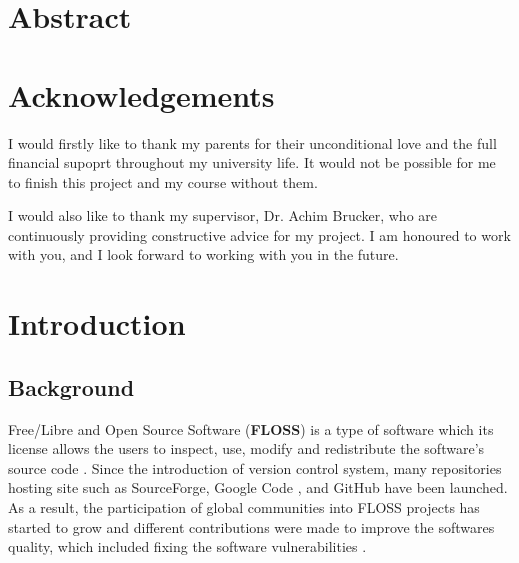 \documentclass[12pt, a4paper]{report}
\begin{document}
\newpage

\chapter*{Abstract}

\chapter*{Acknowledgements}
I would firstly like to thank my parents for their unconditional love and the full financial supoprt
throughout my university life. It would not be possible for me to finish this project and my course
without them.

I would also like to thank my supervisor, Dr. Achim Brucker, who are continuously providing
constructive advice for my project. I am honoured to work with you, and I look forward to working
with you in the future.

\newpage

\tableofcontents


\listoftables

\newpage


\chapter{Introduction}
\section{Background}
Free/Libre and Open Source Software (\textbf{FLOSS}) is a type of software which its license allows
the users to inspect, use, modify and redistribute the software's source code \cite{crowston_2012}.
Since the introduction of version control system, many repositories hosting site such as
SourceForge\cite{sourceforge}, Google Code \cite{google_code}, and GitHub \cite{github} have been
launched. As a result, the participation of global communities into FLOSS projects has started to
grow and different contributions were made to improve the softwares quality, which included fixing
the software vulnerabilities \cite{dabbish_2012}.
\end{document}
